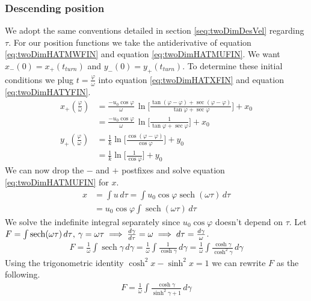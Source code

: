 \documentclass[%
aip,
jmp,
amsmath,amssymb,
reprint,%
]{revtex4-1}
\DeclareMathOperator{\sech}{sech}
\newcommand{\comma}{\hspace{0.1mm},\hspace{0.7mm}}
\begin{document}
	\subsubsection{Descending position}
	We adopt the same conventions detailed in section \ref{seq:twoDimDesVel} regarding $\tau$. For our position functions we take the antiderivative of equation \eqref{eq:twoDimHATMWFIN} and equation \eqref{eq:twoDimHATMUFIN}. We want $x_{-}(0) = x_{+}(t_{turn})$ and $y_{-}(0) = y_{+}(t_{turn})$. To determine these initial conditions we plug $t = \frac{\varphi}{\omega}$ into equation \eqref{eq:twoDimHATXFIN} and equation \eqref{eq:twoDimHATYFIN}.
	\begin{align}\nonumber
		x_{+}(\frac{\varphi}{\omega}) &= \frac{-u_0\cos\varphi}{\omega}\,\ln\Bigg\lbrack\frac{\tan(\varphi-\varphi)+\sec(\varphi-\varphi)}{\tan\varphi+\sec\varphi}\Bigg\rbrack +x_0 \\\label{eq:twoDimHATDXTURN}
		&= \frac{-u_0\cos\varphi}{\omega}\,\ln\Bigg\lbrack\frac{1}{\tan\varphi+\sec\varphi}\Bigg\rbrack +x_0\\\nonumber
		y_{+}(\frac{\varphi}{\omega}) &= \frac{1}{k}\ln\Bigg\lbrack\frac{\cos(\varphi-\varphi)}{\cos\varphi}\Bigg\rbrack+y_0\\\label{eq:twoDimHATDYTURN}
		&= \frac{1}{k}\ln\Bigg\lbrack\frac{1}{\cos\varphi}\Bigg\rbrack+y_0
	\end{align}
	We can now drop the $-$ and $+$ postfixes and solve equation \eqref{eq:twoDimHATMUFIN} for $x$.
	\begin{align}\nonumber
		x &= \int u\,d\tau = \int u_0\cos\varphi\sech(\omega\tau)\,d\tau\\\nonumber
		&= u_0\cos\varphi\int\sech(\omega\tau)\,d\tau
	\end{align}
	We solve the indefinite integral separately since $u_0\cos\varphi$ doesn't depend on $\tau$. Let $F = \int\sech(\omega\tau)\,d\tau \comma \gamma = \omega\tau \implies \frac{d\gamma}{d\tau} = \omega \implies d\tau = \frac{d\gamma}{\omega}$.
	\begin{align}\nonumber
		F=\frac{1}{\omega}\int\sech\gamma\,d\gamma = \frac{1}{\omega}\int \frac{1}{\cosh\gamma} \,d\gamma = \frac{1}{\omega}\int \frac{\cosh\gamma}{\cosh^2\gamma} \,d\gamma
	\end{align}
	Using the trigonometric identity $\cosh^2x - \sinh^2x = 1$ we can rewrite $F$ as the following.
	\begin{align}\nonumber
		F = \frac{1}{\omega}\int \frac{\cosh\gamma}{\sinh^2\gamma+1} \,d\gamma
	\end{align}
\end{document}
